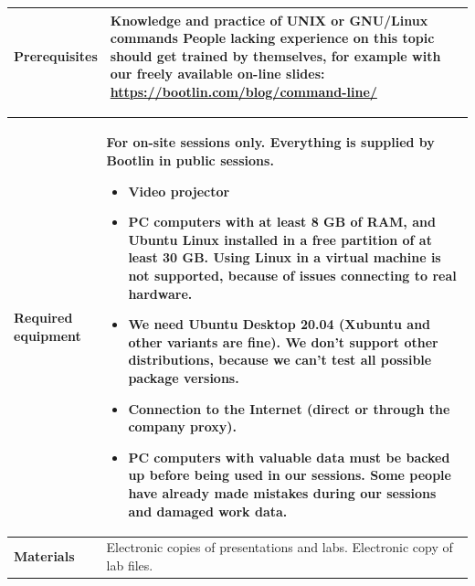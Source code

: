 \documentclass[a4paper,12pt,obeyspaces,spaces,hyphens]{article}
\begin{document}
{\begin{tabularx}{\textwidth}{|g|h|}
    {\bf Prerequisites} & {\bf Knowledge and practice of UNIX or
      GNU/Linux commands}
    \newline People lacking experience on this topic should get
    trained by themselves, for example with our freely available
    on-line slides:
    \newline \url{https://bootlin.com/blog/command-line/} \vspace{1em}
     \\
    \hline
  \end{tabularx}

  \begin{tabularx}{\textwidth}{|g|h|}
    {\bf Required equipment} &
    {\bf For on-site sessions only.}
    \newline Everything is supplied by Bootlin in public sessions.
    \begin{itemize}
    \item Video projector
    \item PC computers with at least 8 GB of RAM, and Ubuntu Linux
    installed in a {\bf free partition of at least 30 GB. Using Linux
      in a virtual machine is not supported}, because of issues
    connecting to real hardware.
    \item We need Ubuntu Desktop 20.04 (Xubuntu and other
    variants are fine). We don't support other
    distributions, because we can't test all possible package versions.
    \item {\bf Connection to the Internet} (direct or through the
    company proxy).
    \item {\bf PC computers with valuable data must be backed up}
    before being used in our sessions.  Some people have already made
    mistakes during our sessions and damaged work data.
    \end{itemize}\\
    \hline

    {\bf Materials} & Electronic copies of presentations and
    labs.
    \newline Electronic copy of lab files.\\
    \hline

\end{tabularx}}
\normalsize
\end{document}
